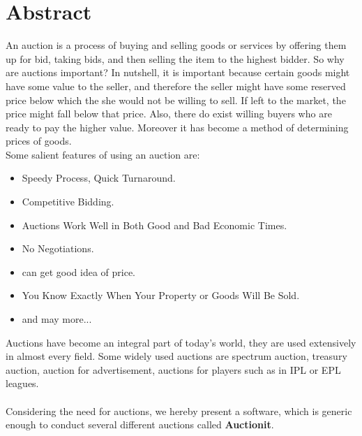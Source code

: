 \documentclass[a4paper]{article}
\begin{document}

% 
\section*{Abstract}




An auction is a process of buying and selling goods or services by offering them up for bid, 
taking bids, and then selling the item to the highest bidder. 
So why are auctions important? In nutshell, it is important because certain goods might have some value to the seller,
and therefore the seller might have some reserved price below which the she would not be willing to sell.
If left to the market, the price might fall below that price.
Also, there do exist willing buyers who are ready to pay the higher value.
Moreover it has become a method of determining prices of goods. \\
Some salient features of using an auction are:
\begin{itemize}
    \item Speedy Process, Quick Turnaround.
    \item Competitive Bidding.
    \item Auctions Work Well in Both Good and Bad Economic Times.
    \item No Negotiations.
    \item can get good idea of price.
    \item You Know Exactly When Your Property or Goods Will Be Sold.
    \item and may more...
\end{itemize}
Auctions have become an integral part of today's world, they are used extensively in almost every field. Some widely used auctions are spectrum auction, treasury auction, auction for advertisement, auctions for players such as in IPL or EPL leagues.\\ \\
Considering the need for auctions, we hereby present a software, which is generic enough to conduct several different auctions called \textbf{Auctionit}.


\pagebreak
\end{document}
